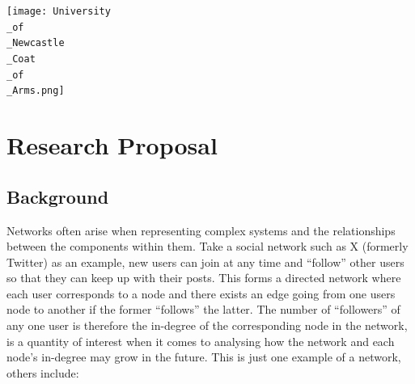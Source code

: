 \documentclass[
]{article}
\begin{document}
\begin{titlepage}
{\vspace{1pt}
}

\newcommand{\logoblock}{{\texttt{[image: University\\\_of\\\_Newcastle\\\_Coat\\\_of\\\_Arms.png]}}

\vspace{1cm}
}

\newcommand{\footerblock}{{\titlepagefooterblock}

\vspace{1pt}
}

\newcommand{\dateblock}{}

\newcommand{\headerblock}{}

\thispagestyle{empty} %


\newlength{\minipagewidth}
\setlength{\minipagewidth}{\textwidth}
\raggedright %
\begin{minipage}[b][\textheight][s]{\minipagewidth}
\titlepagepagealign
\titleblock

\authorblock

\vfill

\logoblock

\footerblock
\par

\end{minipage}
\clearpage
\restoregeometry
\end{titlepage}
\setcounter{page}{1}

\section{Research Proposal}\label{research-proposal}

\subsection{Background}\label{sec-bg}

Networks often arise when representing complex systems and the
relationships between the components within them. Take a social network
such as X (formerly Twitter) as an example, new users can join at any
time and ``follow'' other users so that they can keep up with their
posts. This forms a directed network where each user corresponds to a
node and there exists an edge going from one users node to another if
the former ``follows'' the latter. The number of ``followers'' of any
one user is therefore the in-degree of the corresponding node in the
network, is a quantity of interest when it comes to analysing how the
network and each node's in-degree may grow in the future. This is just
one example of a network, others include:
\end{document}
